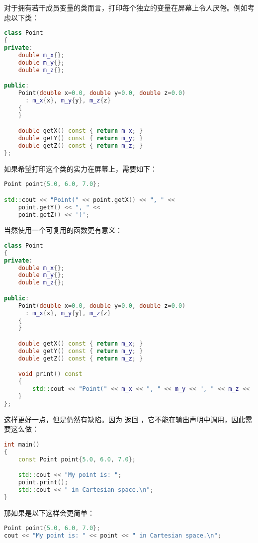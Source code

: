 \documentclass[../../LearnCpp.tex]{subfiles}
\begin{document}

对于拥有若干成员变量的类而言，打印每个独立的变量在屏幕上令人厌倦。例如考虑以下类：

\begin{lstlisting}[language=C++]
class Point
{
private:
    double m_x{};
    double m_y{};
    double m_z{};

public:
    Point(double x=0.0, double y=0.0, double z=0.0)
      : m_x{x}, m_y{y}, m_z{z}
    {
    }

    double getX() const { return m_x; }
    double getY() const { return m_y; }
    double getZ() const { return m_z; }
};
\end{lstlisting}

如果希望打印这个类的实力在屏幕上，需要如下：

\begin{lstlisting}[language=C++]
Point point{5.0, 6.0, 7.0};

std::cout << "Point(" << point.getX() << ", " <<
    point.getY() << ", " <<
    point.getZ() << ')';
\end{lstlisting}

当然使用一个可复用的函数更有意义：

\begin{lstlisting}[language=C++]
class Point
{
private:
    double m_x{};
    double m_y{};
    double m_z{};

public:
    Point(double x=0.0, double y=0.0, double z=0.0)
      : m_x{x}, m_y{y}, m_z{z}
    {
    }

    double getX() const { return m_x; }
    double getY() const { return m_y; }
    double getZ() const { return m_z; }

    void print() const
    {
        std::cout << "Point(" << m_x << ", " << m_y << ", " << m_z << ')';
    }
};
\end{lstlisting}

这样更好一点，但是仍然有缺陷。因为  返回 ，它不能在输出声明中调用，因此需要这么做：

\begin{lstlisting}[language=C++]
int main()
{
    const Point point{5.0, 6.0, 7.0};

    std::cout << "My point is: ";
    point.print();
    std::cout << " in Cartesian space.\n";
}
\end{lstlisting}

那如果是以下这样会更简单：

\begin{lstlisting}[language=C++]
Point point{5.0, 6.0, 7.0};
cout << "My point is: " << point << " in Cartesian space.\n";
\end{lstlisting}
\end{document}
